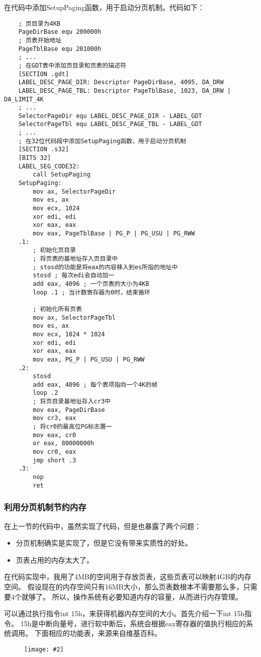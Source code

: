 \documentclass[a4paper,left=2.5cm,right=2.5cm,11pt]{article}
\newcommand{\sizedfic}[2]{\begin{figure}[H]
		\center
		\texttt{[image: \#2]}
	\end{figure}}
\begin{document}
	在代码中添加SetupPaging函数，用于启动分页机制。代码如下：
	\begin{lstlisting}
	; 页目录为4KB
	PageDirBase equ 200000h
	; 页表开始地址
	PageTblBase equ 201000h
	; ...
	; 在GDT表中添加页目录和页表的描述符
	[SECTION .gdt]
	LABEL_DESC_PAGE_DIR: Descriptor PageDirBase, 4095, DA_DRW
	LABEL_DESC_PAGE_TBL: Descriptor PageTblBase, 1023, DA_DRW | DA_LIMIT_4K
	; ...
	SelectorPageDir equ LABEL_DESC_PAGE_DIR - LABEL_GDT
	SelectorPageTbl equ LABEL_DESC_PAGE_TBL - LABEL_GDT
	; ...
	; 在32位代码段中添加SetupPaging函数，用于启动分页机制
	[SECTION .s32]
	[BITS 32]
	LABEL_SEG_CODE32:
		call SetupPaging
	SetupPaging:
		mov ax, SelectorPageDir
		mov es, ax
		mov ecx, 1024
		xor edi, edi
		xor eax, eax
		mov eax, PageTblBase | PG_P | PG_USU | PG_RWW
	.1:
		; 初始化页目录
		; 将页表的基地址存入页目录中
		; stosd的功能是将eax的内容移入到es所指的地址中
		stosd ; 每次edi会自动加一
		add eax, 4096 ; 一个页表的大小为4KB
		loop .1 ; 当计数寄存器为0时，结束循环

		; 初始化所有页表
		mov ax, SelectorPageTbl
		mov es, ax
		mov ecx, 1024 * 1024
		xor edi, edi
		xor eax, eax
		mov eax, PG_P | PG_USU | PG_RWW
	.2:
		stosd
		add eax, 4096 ; 每个表项指向一个4K的帧
		loop .2
		; 将页目录基地址存入cr3中
		mov eax, PageDirBase
		mov cr3, eax
		; 将cr0的最高位PG标志置一
		mov eax, cr0
		or eax, 80000000h
		mov cr0, eax
		jmp short .3
	.3:
		nop
		ret
	\end{lstlisting}

\subsubsection{利用分页机制节约内存}
	在上一节的代码中，虽然实现了代码，但是也暴露了两个问题：
	\begin{itemize}
		\item 分页机制确实是实现了，但是它没有带来实质性的好处。
		\item 页表占用的内存太大了。
	\end{itemize}

	在代码实现中，我用了4MB的空间用于存放页表，这些页表可以映射4GB的内存空间。
	假设现在的内存空间只有16MB大小，那么页表数根本不需要那么多，只需要4个就够了。
	所以，操作系统有必要知道内存的容量，从而进行内存管理。\par

	可以通过执行指令int 15h，来获得机器内存空间的大小。首先介绍一下int 15h指令。
	15h是中断向量号，进行软中断后，系统会根据eax寄存器的值执行相应的系统调用。
	下面相应的功能表，来源来自维基百科。
	\sizedfic{1}{6.png}
	
\end{document}
